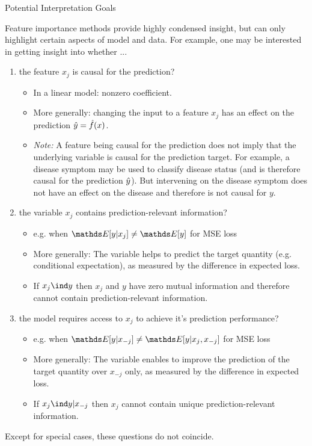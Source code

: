 \documentclass[11pt,compress,t,notes=noshow, xcolor=table]{beamer}
\begin{document}
\begin{vbframe}{Potential Interpretation Goals}

Feature importance methods provide highly condensed insight, but can only highlight certain aspects of model and data. For example, one may be interested in getting insight into whether ...
\lz
\begin{enumerate}
    \item the feature $x_j$ is causal for the prediction?
    \begin{itemize}
      \item In a linear model: nonzero coefficient.
      \item More generally: changing the input to a feature $x_j$ has an effect on the prediction $\yh = \fh(x)$.
      \item \textit{Note:} A feature being causal for the prediction does not imply that the underlying variable is causal for the prediction target. For example, a disease symptom may be used to classify disease status (and is therefore causal for the prediction $\yh$). But intervening on the disease symptom does not have an effect on the disease and therefore is not causal for $y$.
    \end{itemize} \framebreak
    \item the variable $x_j$ contains prediction-relevant information?
    \begin{itemize}
      \item e.g. when $\E[y|x_j] \neq \E[y]$ for MSE loss
      \item More generally: The variable helps to predict the target quantity (e.g. conditional expectation), as measured by the difference in expected loss.
      \item If $x_j \ind y$ then $x_j$ and $y$ have zero mutual information and therefore cannot contain prediction-relevant information.
    \end{itemize}
    \item the model requires access to $x_j$ to achieve it's prediction performance?
    \begin{itemize}
      \item e.g. when $\E[y|x_{-j}] \neq \E[y|x_j, x_{-j}]$ for MSE loss
      \item More generally: The variable enables to improve the prediction of the target quantity over $x_{-j}$ only, as measured by the difference in expected loss.
      \item If $x_j \ind y | x_{-j}$ then $x_j$ cannot contain unique prediction-relevant information.
    \end{itemize}
\end{enumerate}
Except for special cases, these questions do not coincide.
\end{vbframe}
\end{document}
